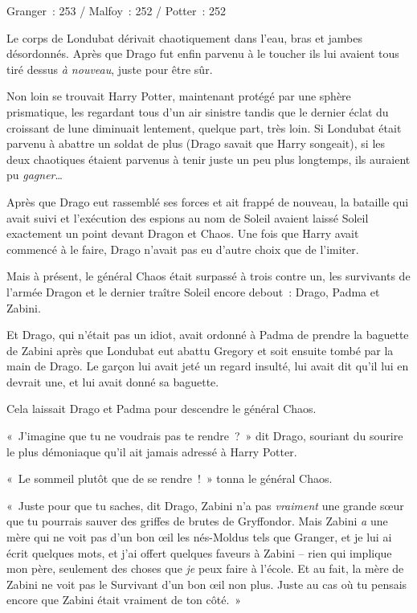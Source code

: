 \later

Granger~: 253 / Malfoy~: 252 / Potter~: 252

Le corps de Londubat dérivait chaotiquement dans l'eau, bras et jambes désordonnés. Après que Drago fut enfin parvenu à le toucher ils lui avaient tous tiré dessus \emph{à nouveau}, juste pour être sûr.

Non loin se trouvait Harry Potter, maintenant protégé par une sphère prismatique, les regardant tous d'un air sinistre tandis que le dernier éclat du croissant de lune diminuait lentement, quelque part, très loin. Si Londubat était parvenu à abattre un soldat de plus (Drago savait que Harry songeait), si les deux chaotiques étaient parvenus à tenir juste un peu plus longtemps, ils auraient pu \emph{gagner}…

Après que Drago eut rassemblé ses forces et ait frappé de nouveau, la bataille qui avait suivi et l'exécution des espions au nom de Soleil avaient laissé Soleil exactement un point devant Dragon et Chaos. Une fois que Harry avait commencé à le faire, Drago n'avait pas eu d'autre choix que de l'imiter.

Mais à présent, le général Chaos était surpassé à trois contre un, les survivants de l'armée Dragon et le dernier traître Soleil encore debout~: Drago, Padma et Zabini.

Et Drago, qui n'était pas un idiot, avait ordonné à Padma de prendre la baguette de Zabini après que Londubat eut abattu Gregory et soit ensuite tombé par la main de Drago. Le garçon lui avait jeté un regard insulté, lui avait dit qu'il lui en devrait une, et lui avait donné sa baguette.

Cela laissait Drago et Padma pour descendre le général Chaos.

«~J'imagine que tu ne voudrais pas te rendre~?~» dit Drago, souriant du sourire le plus démoniaque qu'il ait jamais adressé à Harry Potter.

«~Le sommeil plutôt que de se rendre~!~» tonna le général Chaos.

«~Juste pour que tu saches, dit Drago, Zabini n'a pas \emph{vraiment} une grande sœur que tu pourrais sauver des griffes de brutes de Gryffondor. Mais Zabini \emph{a} une mère qui ne voit pas d'un bon œil les nés-Moldus tels que Granger, et je lui ai écrit quelques mots, et j'ai offert quelques faveurs à Zabini -- rien qui implique mon père, seulement des choses que \emph{je} peux faire à l'école. Et au fait, la mère de Zabini ne voit pas le Survivant d'un bon œil non plus. Juste au cas où tu pensais encore que Zabini était vraiment de ton côté.~»

